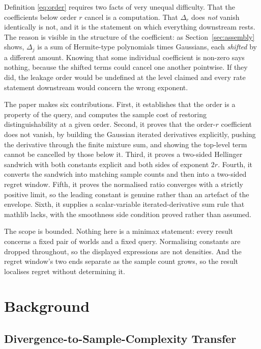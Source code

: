 \documentclass[conference]{IEEEtran}
\theoremstyle{definition}
\begin{document}
Definition \eqref{eq:order} requires two facts of very unequal difficulty. That the
coefficients below order $r$ cancel is a computation. That $\Delta_{r}$ does \emph{not}
vanish identically is not, and it is the statement on which everything downstream rests. The
reason is visible in the structure of the coefficient: as
Section~\ref{sec:assembly} shows, $\Delta_{j}$ is a sum of Hermite-type polynomials times
Gaussians, each \emph{shifted} by a different amount. Knowing that some individual
coefficient is non-zero says nothing, because the shifted terms could cancel one another
pointwise. If they did, the leakage order would be undefined at the level claimed and every
rate statement downstream would concern the wrong exponent.

The paper makes six contributions. First, it establishes that the order is a property of the
query, and computes the sample cost of restoring distinguishability at a given order. Second,
it proves that the order-$r$ coefficient does not vanish, by building the Gaussian iterated
derivatives explicitly, pushing the derivative through the finite mixture sum, and showing
the top-level term cannot be cancelled by those below it. Third, it proves a two-sided
Hellinger sandwich with both constants explicit and both sides of exponent $2r$. Fourth, it
converts the sandwich into matching sample counts and then into a two-sided regret window.
Fifth, it proves the normalised ratio converges with a strictly positive limit, so the
leading constant is genuine rather than an artefact of the envelope. Sixth, it supplies a
scalar-variable iterated-derivative sum rule that mathlib lacks, with the smoothness side
condition proved rather than assumed.

The scope is bounded. Nothing here is a minimax statement: every result concerns a fixed
pair of worlds and a fixed query. Normalising constants are dropped throughout, so the
displayed expressions are not densities. And the regret window's two ends separate as the
sample count grows, so the result localises regret without determining it.

\section{Background}

\subsection{Divergence-to-Sample-Complexity Transfer}
\end{document}
